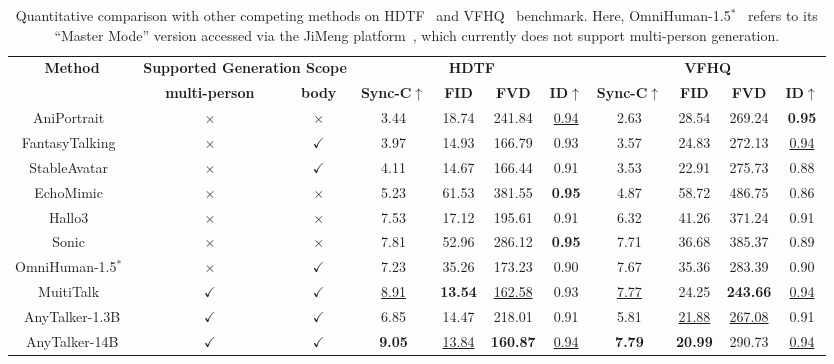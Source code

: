 \begin{table}[t]
    \centering
    \small
    \caption{Quantitative comparison with other competing methods on HDTF~\cite{zhang2021flow} and VFHQ~\cite{xie2022vfhq} benchmark.
    Here, OmniHuman-1.5$^{*}$~\cite{jiang2025omnihuman} refers to its ``Master Mode'' version accessed via the JiMeng platform~\cite{jimeng_platform}, which currently does not support multi-person generation.
    }
    \begin{tabular}{ccccccccccc}
        \toprule
        \multirow{2}{*}{\textbf{Method}} & \multicolumn{2}{c}{\textbf{Supported Generation Scope}} & \multicolumn{4}{c}{\textbf{HDTF}} & \multicolumn{4}{c}{\textbf{VFHQ}} \\
        \cmidrule(lr){2-3} \cmidrule(lr){4-7} \cmidrule(lr){8-11}
        & \textbf{multi-person} & \textbf{body} & \textbf{Sync-C$\uparrow$} & \textbf{FID} & \textbf{FVD} & \textbf{ID$\uparrow$} & \textbf{Sync-C$\uparrow$} & \textbf{FID} & \textbf{FVD} & \textbf{ID$\uparrow$} \\
        \midrule
        AniPortrait~\cite{wei2024aniportrait} &  $\times$ & $\times$ & 3.44 & 18.74 & 241.84 & \underline{0.94} & 2.63 & 28.54 & 269.24 & \textbf{0.95} \\
        FantasyTalking~\cite{wang2025fantasytalking} &  $\times$ & $\checkmark$ & 3.97 & 14.93 & 166.79 & 0.93 & 3.57 & 24.83 & 272.13 & \underline{0.94} \\
        StableAvatar~\cite{tu2025stableavatar} &  $\times$ & $\checkmark$  & 4.11 & 14.67 & 166.44 & 0.91 & 3.53 & 22.91 & 275.73 & 0.88 \\
        EchoMimic~\cite{chen2025echomimic} &  $\times$ & $\times$ & 5.23 & 61.53 & 381.55 & \textbf{0.95} & 4.87 & 58.72 & 486.75 & 0.86 \\
        Hallo3~\cite{cui2025hallo3} & $\times$ & $\times$ & 7.53 & 17.12 & 195.61 & 0.91 & 6.32 & 41.26 & 371.24 & 0.91 \\
        Sonic~\cite{ji2025sonic} &  $\times$ & $\times$ & 7.81 & 52.96 & 286.12 & \textbf{0.95} & 7.71 & 36.68 & 385.37 & 0.89 \\
        OmniHuman-1.5$^{*}$~\cite{jiang2025omnihuman} &  $\times$ & $\checkmark$   & 7.23  & 35.26  & 173.23  & 0.90  & 7.67  & 35.36  & 283.39  & 0.90  \\
        MuitiTalk~\cite{kong2025let} &  $\checkmark$ & $\checkmark$ & \underline{8.91} & \textbf{13.54} & \underline{162.58} & 0.93 &  \underline{7.77} & 24.25 & \textbf{243.66} & \underline{0.94} \\
        \midrule
        AnyTalker-1.3B & $\checkmark$ & $\checkmark$ & 6.85 & 14.47 & 218.01 & 0.91 & 5.81 & \underline{21.88} & \underline{267.08} & 0.91 \\
        AnyTalker-14B & $\checkmark$ & $\checkmark$ & \textbf{9.05} & \underline{13.84} & \textbf{160.87} & \underline{0.94} & \textbf{7.79} & \textbf{20.99} & 290.73 & \underline{0.94} \\
        \bottomrule
    \end{tabular}
    \label{tab:single-benchmark}
\end{table}

